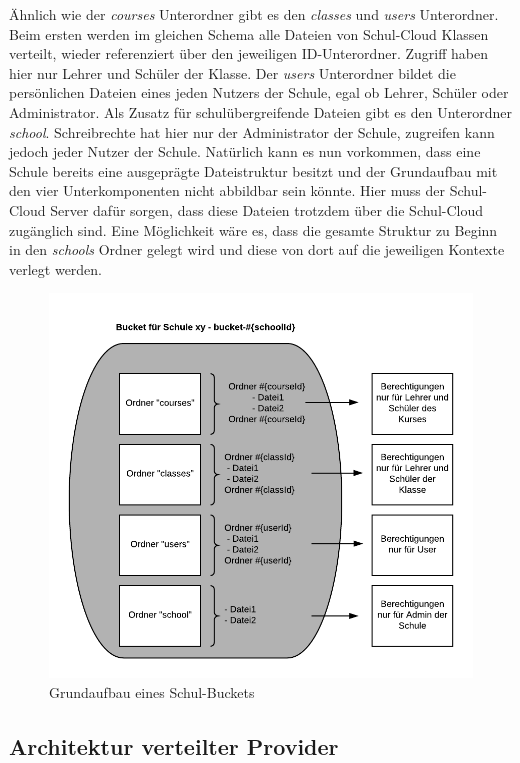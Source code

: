 Ähnlich wie der \textit{courses} Unterordner gibt es den \textit{classes} und \textit{users} Unterordner. Beim ersten werden im gleichen Schema alle Dateien von Schul-Cloud Klassen verteilt, wieder referenziert über den jeweiligen ID-Unterordner. Zugriff haben hier nur Lehrer und Schüler der Klasse. Der \textit{users} Unterordner bildet die persönlichen Dateien eines jeden Nutzers der Schule, egal ob Lehrer, Schüler oder Administrator. Als Zusatz für schulübergreifende Dateien gibt es den Unterordner \textit{school}. Schreibrechte hat hier nur der Administrator der Schule, zugreifen kann jedoch jeder Nutzer der Schule. Natürlich kann es nun vorkommen, dass eine Schule bereits eine ausgeprägte Dateistruktur besitzt und der Grundaufbau mit den vier Unterkomponenten nicht abbildbar sein könnte. Hier muss der Schul-Cloud Server dafür sorgen, dass diese Dateien trotzdem über die Schul-Cloud zugänglich sind. Eine Möglichkeit wäre es, dass die gesamte Struktur zu Beginn in den \textit{schools} Ordner gelegt wird und diese von dort auf die jeweiligen Kontexte verlegt werden.

\begin{figure}[H]
	\centering
	\includegraphics[width=0.8\linewidth]{images/AufbauDateiverwaltung}
	\caption[Caption for concept]{Grundaufbau eines Schul-Buckets}
	\label{fig:aufbau}
\end{figure}

\subsection{Architektur verteilter Provider}
\label{sec:strategypatternconcept}

